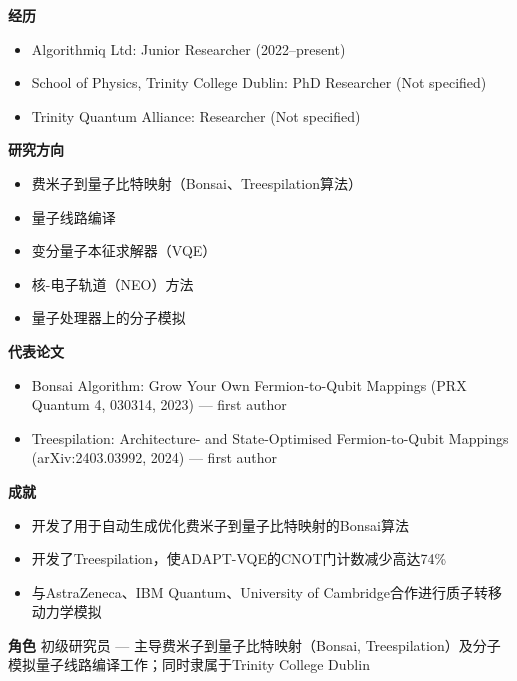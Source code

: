 \par{\footnotesize\color{mainred}\textbf{经历}}
\begin{itemize}[leftmargin=1.2em,itemsep=0pt,topsep=0pt]
\item {\footnotesize Algorithmiq Ltd: Junior Researcher (2022–present)}
\item {\footnotesize School of Physics, Trinity College Dublin: PhD Researcher (Not specified)}
\item {\footnotesize Trinity Quantum Alliance: Researcher (Not specified)}
\end{itemize}
\par{\footnotesize\color{mainred}\textbf{研究方向}}
\begin{itemize}[leftmargin=1.2em,itemsep=0pt,topsep=0pt]
\item {\footnotesize 费米子到量子比特映射（Bonsai、Treespilation算法）}
\item {\footnotesize 量子线路编译}
\item {\footnotesize 变分量子本征求解器（VQE）}
\item {\footnotesize 核-电子轨道（NEO）方法}
\item {\footnotesize 量子处理器上的分子模拟}
\end{itemize}
\par{\footnotesize\color{mainred}\textbf{代表论文}}
\begin{itemize}[leftmargin=1.2em,itemsep=0pt,topsep=0pt]
\item {\footnotesize Bonsai Algorithm: Grow Your Own Fermion-to-Qubit Mappings (PRX Quantum 4, 030314, 2023) — first author}
\item {\footnotesize Treespilation: Architecture- and State-Optimised Fermion-to-Qubit Mappings (arXiv:2403.03992, 2024) — first author}
\end{itemize}
\par{\footnotesize\color{mainred}\textbf{成就}}
\begin{itemize}[leftmargin=1.2em,itemsep=0pt,topsep=0pt]
\item {\footnotesize 开发了用于自动生成优化费米子到量子比特映射的Bonsai算法}
\item {\footnotesize 开发了Treespilation，使ADAPT-VQE的CNOT门计数减少高达74\%}
\item {\footnotesize 与AstraZeneca、IBM Quantum、University of Cambridge合作进行质子转移动力学模拟}
\end{itemize}
\par{\footnotesize\color{mainred}\textbf{角色}} {\footnotesize 初级研究员 — 主导费米子到量子比特映射（Bonsai, Treespilation）及分子模拟量子线路编译工作；同时隶属于Trinity College Dublin}
